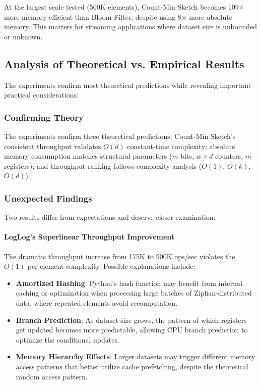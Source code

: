 At the largest scale tested (500K elements), Count-Min Sketch becomes 109$\times$ more memory-efficient than Bloom Filter, despite using 8$\times$ more absolute memory. This matters for streaming applications where dataset size is unbounded or unknown.

\subsection{Analysis of Theoretical vs. Empirical Results}

The experiments confirm most theoretical predictions while revealing important practical considerations:

\subsubsection{Confirming Theory}

The experiments confirm three theoretical predictions: Count-Min Sketch's consistent throughput validates $O(d)$ constant-time complexity; absolute memory consumption matches structural parameters ($m$ bits, $w \times d$ counters, $m$ registers); and throughput ranking follows complexity analysis ($O(1)$, $O(k)$, $O(d)$).

\subsubsection{Unexpected Findings}

Two results differ from expectations and deserve closer examination:

\paragraph{LogLog's Superlinear Throughput Improvement}

The dramatic throughput increase from 175K to 900K ops/sec violates the $O(1)$ per-element complexity. Possible explanations include:

\begin{itemize}
    \item \textbf{Amortized Hashing}: Python's hash function may benefit from internal caching or optimization when processing large batches of Zipfian-distributed data, where repeated elements avoid recomputation.

    \item \textbf{Branch Prediction}: As dataset size grows, the pattern of which registers get updated becomes more predictable, allowing CPU branch prediction to optimize the conditional updates.

    \item \textbf{Memory Hierarchy Effects}: Larger datasets may trigger different memory access patterns that better utilize cache prefetching, despite the theoretical random access pattern.
\end{itemize}


